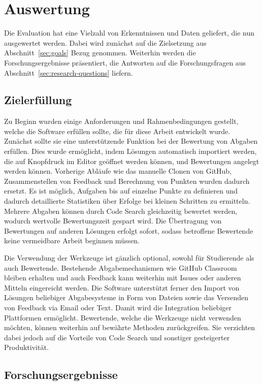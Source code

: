 \chapter{Auswertung}\label{ch:results}

Die Evaluation hat eine Vielzahl von Erkenntnissen und Daten geliefert, die nun ausgewertet werden.
Dabei wird zunächst auf die Zielsetzung aus Abschnitt~\ref{sec:goals} Bezug genommen.
Weiterhin werden die Forschungsergebnisse präsentiert, die Antworten auf die Forschungsfragen aus Abschnitt~\ref{sec:research-questions} liefern.

\section{Zielerfüllung}\label{sec:goals-reached}

Zu Beginn wurden einige Anforderungen und Rahmenbedingungen gestellt, welche die Software erfüllen sollte, die für diese Arbeit entwickelt wurde.
Zunächst sollte sie eine unterstützende Funktion bei der Bewertung von Abgaben erfüllen.
Dies wurde ermöglicht, indem Lösungen automatisch importiert werden, die auf Knopfdruck im Editor geöffnet werden können, und Bewertungen angelegt werden können.
Vorherige Abläufe wie das manuelle Clonen von GitHub, Zusammenstellen von Feedback und Berechnung von Punkten wurden dadurch ersetzt.
Es ist möglich, Aufgaben bis auf einzelne Punkte zu definieren und dadurch detaillierte Statistiken über Erfolge bei kleinen Schritten zu ermitteln.
Mehrere Abgaben können durch Code Search gleichzeitig bewertet werden, wodurch wertvolle Bewertungszeit gespart wird.
Die Übertragung von Bewertungen auf anderen Lösungen erfolgt sofort, sodass betroffene Bewertende keine vermeidbare Arbeit beginnen müssen.

Die Verwendung der Werkzeuge ist gänzlich optional, sowohl für Studierende als auch Bewertende.
Bestehende Abgabemechanismen wie GitHub Classroom bleiben erhalten und auch Feedback kann weiterhin mit Issues oder anderen Mitteln eingereicht werden.
Die Software unterstützt ferner den Import von Lösungen beliebiger Abgabesysteme in Form von Dateien sowie das Versenden von Feedback via Email oder Text.
Damit wird die Integration beliebiger Plattformen ermöglicht.
Bewertende, welche die Werkzeuge nicht verwenden möchten, können weiterhin auf bewährte Methoden zurückgreifen.
Sie verzichten dabei jedoch auf die Vorteile von Code Search und sonstiger gesteigerter Produktivität.

\section{Forschungsergebnisse}\label{sec:research-results}

